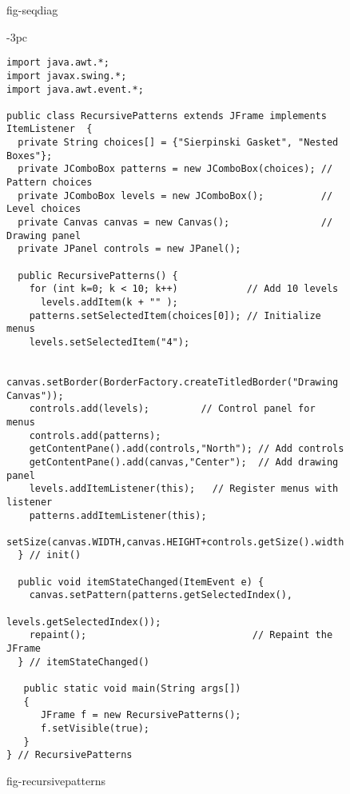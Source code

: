 \begin{figure}[tb]
 {fig-seqdiag}

\end{figure}
\begin{figure}[h!]
\jjjprogstart
\begin{jjjlistingleft}[33pc]{-3pc}
\begin{lstlisting}
import java.awt.*;
import javax.swing.*;
import java.awt.event.*;

public class RecursivePatterns extends JFrame implements ItemListener  {
  private String choices[] = {"Sierpinski Gasket", "Nested Boxes"};
  private JComboBox patterns = new JComboBox(choices); // Pattern choices
  private JComboBox levels = new JComboBox();          // Level choices
  private Canvas canvas = new Canvas();                // Drawing panel
  private JPanel controls = new JPanel();

  public RecursivePatterns() {
    for (int k=0; k < 10; k++)            // Add 10 levels
      levels.addItem(k + "" );
    patterns.setSelectedItem(choices[0]); // Initialize menus
    levels.setSelectedItem("4");

    canvas.setBorder(BorderFactory.createTitledBorder("Drawing Canvas"));
    controls.add(levels);         // Control panel for menus
    controls.add(patterns);
    getContentPane().add(controls,"North"); // Add controls
    getContentPane().add(canvas,"Center");  // Add drawing panel
    levels.addItemListener(this);   // Register menus with listener
    patterns.addItemListener(this);
    setSize(canvas.WIDTH,canvas.HEIGHT+controls.getSize().width);
  } // init()

  public void itemStateChanged(ItemEvent e) {
    canvas.setPattern(patterns.getSelectedIndex(), 
                                     levels.getSelectedIndex());
    repaint();                             // Repaint the JFrame
  } // itemStateChanged()

   public static void main(String args[]) 
   {  
      JFrame f = new RecursivePatterns();
      f.setVisible(true);
   }
} // RecursivePatterns
\end{lstlisting}
\end{jjjlistingleft}
{fig-recursivepatterns}
\end{figure}


